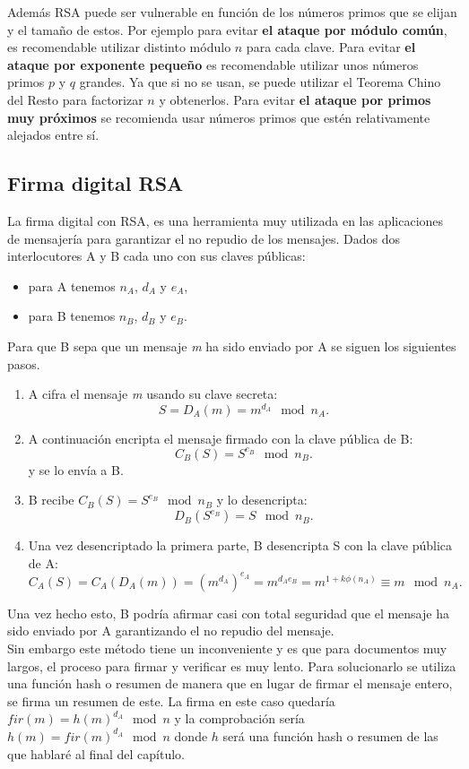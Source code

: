 Además RSA puede ser vulnerable en función de los números primos que se elijan y el tamaño de estos. 
Por ejemplo para evitar \textbf{el ataque por módulo común}, es recomendable utilizar distinto módulo $n$ para cada clave. 
Para evitar \textbf{el ataque por exponente pequeño} es recomendable utilizar unos números primos $p$ y $q$ grandes. Ya que si no se usan, se puede utilizar el Teorema Chino del Resto para factorizar $n$ y obtenerlos. 
Para evitar \textbf{el ataque por primos muy próximos} se recomienda usar números primos que estén relativamente alejados entre sí. 

\subsection{Firma digital RSA}
La firma digital con RSA, es una herramienta muy utilizada en las aplicaciones de mensajería para garantizar el no repudio de los mensajes.
Dados dos interlocutores A y B cada uno con sus claves públicas:
\begin{itemize}
	\item para A tenemos $n_A$, $d_A$ y $e_A$,  
	\item para B tenemos $n_B$, $d_B$ y $e_B$.  
\end{itemize}
Para que B sepa que un mensaje \emph{m} ha sido enviado por A se siguen los siguientes pasos.
\begin{enumerate}
	\item A cifra el mensaje \emph{m} usando su clave secreta:
		$$
			S=D_A(m)=m^{d_A} \mod n_A.
		$$
	\item A continuación encripta el mensaje firmado con la clave pública de B:
		$$
			C_B(S)=S^{e_B}\mod n_B.
		$$
		y se lo envía a B.
	\item B recibe $C_B(S)=S^{e_B} \mod n_B$ y lo desencripta: 
		$$
			D_B(S^{e_B})=S \mod n_B.
		$$
	\item Una vez desencriptado la primera parte, B desencripta S con la clave pública de A:
		$$
			C_A(S)=C_A(D_A(m))=(m^{d_A})^{e_A}=m^{d_Ae_B}=m^{1+k\phi(n_A)}\equiv m \mod n_A.
		$$
\end{enumerate}
Una vez hecho esto, B podría afirmar casi con total seguridad que el mensaje ha sido enviado por A garantizando el no repudio del mensaje.\\
Sin embargo este método tiene un inconveniente y es que para documentos muy largos, el proceso para firmar y verificar es muy lento. Para solucionarlo se utiliza una función hash o resumen de manera que en lugar de firmar el mensaje entero, se firma un resumen de este. La firma en este caso quedaría $fir(m)=h(m)^{d_A} \mod n$ y la comprobación sería $h(m)=fir(m)^{d_A} \mod n$ donde $h$ será una función hash o resumen de las que hablaré al final del capítulo.

